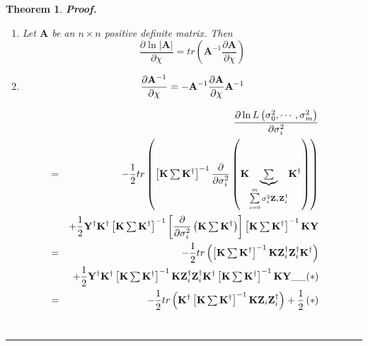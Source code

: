 \documentclass{article}
\newtheorem{theorem}{Theorem}
\newenvironment{proof}[1][Proof]{\noindent\textbf{#1.} }{\ \rule{0.5em}{0.5em}}
\begin{document}
\begin{theorem}
\begin{proof}
\begin{enumerate}
\item Let $\mathbf{A}$ be an $n\times n$ positive definite matrix. Then%
\begin{equation*}
\frac{\partial \ln \left\vert \mathbf{A}\right\vert }{\partial \chi }%
=tr\left( \mathbf{A}^{-1}\frac{\partial \mathbf{A}}{\partial \chi }\right)
\end{equation*}

\item 
\begin{equation*}
\frac{\partial \mathbf{A}^{-1}}{\partial \chi }=-\mathbf{A}^{-1}\frac{%
\partial \mathbf{A}}{\partial \chi }\mathbf{A}^{-1}
\end{equation*}
\end{enumerate}

\begin{eqnarray*}
&&\frac{\partial \ln L\left( \sigma _{0}^{2},\cdots ,\sigma _{m}^{2}\right) 
}{\partial \sigma _{i}^{2}} \\
&=&-\frac{1}{2}tr\left( \left[ \mathbf{K}\tsum \mathbf{K}^{\dagger }\right]
^{-1}\frac{\partial }{\partial \sigma _{i}^{2}}\left( \mathbf{K}\underset{%
\tsum\limits_{i=0}^{m}\sigma _{i}^{2}\mathbf{Z}_{i}\mathbf{Z}_{i}^{\dagger }}%
{\underbrace{\tsum }}\mathbf{K}^{\dagger }\right) \right) \\
&&+\frac{1}{2}\mathbf{Y}^{\dagger }\mathbf{K}^{\dagger }\left[ \mathbf{K}%
\tsum \mathbf{K}^{\dagger }\right] ^{-1}\left[ \frac{\partial }{\partial
\sigma _{i}^{2}}\left( \mathbf{K}\tsum \mathbf{K}^{\dagger }\right) \right] %
\left[ \mathbf{K}\tsum \mathbf{K}^{\dagger }\right] ^{-1}\mathbf{KY} \\
&=&-\frac{1}{2}tr\left( \left[ \mathbf{K}\tsum \mathbf{K}^{\dagger }\right]
^{-1}\mathbf{KZ}_{i}^{\dagger }\mathbf{Z}_{i}^{\dagger }\mathbf{K}^{\dagger
}\right) \\
&&+\frac{1}{2}\mathbf{Y}^{\dagger }\mathbf{K}^{\dagger }\left[ \mathbf{K}%
\tsum \mathbf{K}^{\dagger }\right] ^{-1}\mathbf{KZ}_{i}^{\dagger }\mathbf{Z}%
_{i}^{\dagger }\mathbf{K}^{\dagger }\left[ \mathbf{K}\tsum \mathbf{K}%
^{\dagger }\right] ^{-1}\mathbf{KY\_\_(\ast )} \\
&=&-\frac{1}{2}tr\left( \mathbf{K}^{\dagger }\left[ \mathbf{K}\tsum \mathbf{K%
}^{\dagger }\right] ^{-1}\mathbf{KZ}_{i}\mathbf{Z}_{i}^{\dagger }\right) +%
\frac{1}{2}\left( \ast \right)
\end{eqnarray*}
\end{proof}
\end{theorem}
\end{document}
